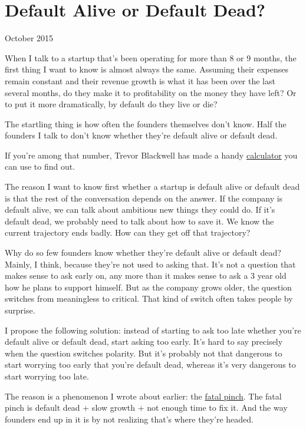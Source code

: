 \chapter{Default Alive or Default Dead?}

October 2015

When I talk to a startup that's been operating for more than 8 or 9
months, the first thing I want to know is almost always the same.
Assuming their expenses remain constant and their revenue growth is what
it has been over the last several months, do they make it to
profitability on the money they have left? Or to put it more
dramatically, by default do they live or die?

The startling thing is how often the founders themselves don't know.
Half the founders I talk to don't know whether they're default alive or
default dead.

If you're among that number, Trevor Blackwell has made a handy
\href{http://growth.tlb.org/\#}{calculator} you can use to find out.

The reason I want to know first whether a startup is default alive or
default dead is that the rest of the conversation depends on the answer.
If the company is default alive, we can talk about ambitious new things
they could do. If it's default dead, we probably need to talk about how
to save it. We know the current trajectory ends badly. How can they get
off that trajectory?

Why do so few founders know whether they're default alive or default
dead? Mainly, I think, because they're not used to asking that. It's not
a question that makes sense to ask early on, any more than it makes
sense to ask a 3 year old how he plans to support himself. But as the
company grows older, the question switches from meaningless to critical.
That kind of switch often takes people by surprise.

I propose the following solution: instead of starting to ask too late
whether you're default alive or default dead, start asking too early.
It's hard to say precisely when the question switches polarity. But it's
probably not that dangerous to start worrying too early that you're
default dead, whereas it's very dangerous to start worrying too late.

The reason is a phenomenon I wrote about earlier: the
\href{pinch.html}{fatal pinch}. The fatal pinch is default dead + slow
growth + not enough time to fix it. And the way founders end up in it is
by not realizing that's where they're headed.

